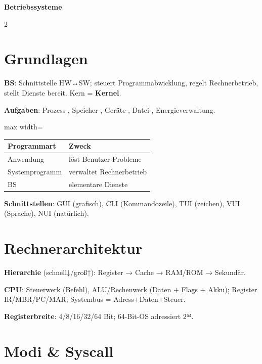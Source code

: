 \documentclass[10pt, a4paper]{article}
\providecommand{\nichttitle}{Formelsammlung}
\renewcommand{\nichttitle}{Betriebssysteme}
\begin{document}
\begin{center}
{\small\bfseries\color{accent}\nichttitle}
\end{center}
\vspace{-6pt}

\scriptsize
\begin{multicols}{2}


\section{Grundlagen}

\textbf{BS}: Schnittstelle HW↔SW; steuert Programmabwicklung, regelt Rechnerbetrieb, stellt Dienste bereit. Kern = \textbf{Kernel}.


\textbf{Aufgaben}: Prozess-, Speicher-, Geräte-, Datei-, Energieverwaltung.



{\small
\begin{adjustbox}{max width=\linewidth}
{\scriptsize
\begin{tabular}{ll}
\toprule
\textbf{Programmart} & \textbf{Zweck} \\
\midrule
Anwendung & löst Benutzer-Probleme \\
Systemprogramm & verwaltet Rechnerbetrieb \\
BS & elementare Dienste \\
\bottomrule
\end{tabular}
}
\end{adjustbox}
}


\textbf{Schnittstellen}: GUI (grafisch), CLI (Kommandozeile), TUI (zeichen), VUI (Sprache), NUI (natürlich).



\section{Rechnerarchitektur}

\textbf{Hierarchie} (schnell↓/groß↑): Register → Cache → RAM/ROM → Sekundär.


\textbf{CPU}: Steuerwerk (Befehl), ALU/Rechenwerk (Daten + Flags + Akku); Register IR/MBR/PC/MAR; Systembus = Adress+Daten+Steuer.


\textbf{Registerbreite}: 4/8/16/32/64 Bit; 64-Bit-OS adressiert 2⁶⁴.



\section{Modi \& Syscall}



\end{multicols}
\end{document}
